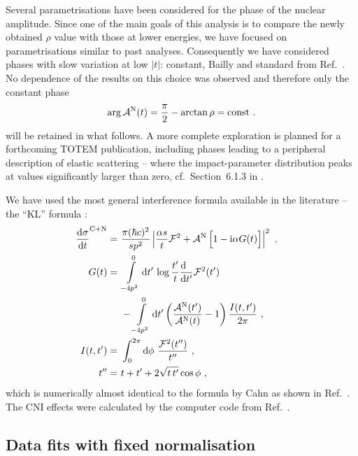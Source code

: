 Several parametrisations have been considered for the phase of the nuclear amplitude. Since one of the main goals of this analysis is to compare the newly obtained $\rho$ value with those at lower energies, we have focused on parametrisations similar to past analyses. Consequently we have considered phases with slow variation at low $|t|$: constant, Bailly and standard from Ref.~\cite{totem-8tev-1km}. No dependence of the results on this choice was observed and therefore only the constant phase
\begin{equation}
\label{eq:nuc phase con}
\arg {\cal A}^{\rm N}(t) = {\pi\over 2} - \arctan\rho = \hbox{const} \ .
\end{equation}
will be retained in what follows. A more complete exploration is planned for a forthcoming TOTEM publication, including phases leading to a peripheral description of elastic scattering -- where the impact-parameter distribution peaks at values significantly larger than zero, cf.~Section~6.1.3 in \cite{totem-8tev-1km}.

We have used the most general interference formula available in the literature -- the ``KL'' formula \cite{kl94}:
\begin{equation}
\label{eq:int kl}
	\begin{aligned}
		{\d\sigma\over \d t}^{\rm C+N} =\ & {\pi (\hbar c)^2 \over s p^2} \left | {\alpha s\over t} {\cal F}^2
			+ {\cal A}^{\rm N}\, \Big[1 - \I\alpha G(t)\Big] \right |^2\ ,\cr
		G(t) =\ & \int\limits_{-4p^2}^0 \d t'\, \log {t'\over t} {\d\phantom{t'}\over \d t'} {\cal F}^2(t')\cr
			  & - \int\limits_{-4p^2}^0 \d t' \left( {{\cal A}^{\rm N}(t') \over {\cal A}^{\rm N}(t)} - 1 \right) { I(t, t')\over 2\pi }\ , \cr
		I(t, t') =\ & \int_0^{2\pi} \d\phi\ {{\cal F}^2(t'')\over t''}\ ,\cr
		t'' =\ & t + t' + 2\sqrt{t\, t'} \cos\phi\ ,\cr
	\end{aligned}
\end{equation}
which is numerically almost identical to the formula by Cahn \cite{cahn82} as shown in Ref.~\cite{totem-8tev-1km}. The CNI effects were calculated by the computer code from Ref.~\cite{elegent}.


\subsection{Data fits with fixed normalisation}
\label{sec:rho anal}

